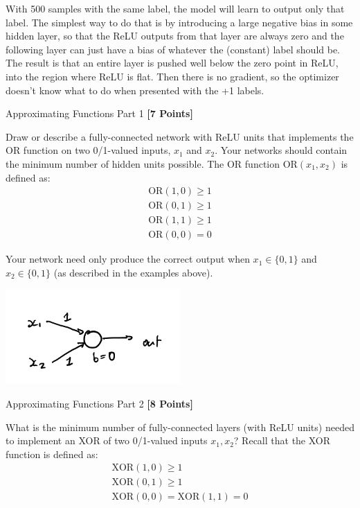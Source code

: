 \textit{}

\begin{solution}
  With 500 samples with the same label, the model will learn to output only that label.
  The simplest way to do that is by introducing a large negative bias in some hidden layer, so that the ReLU outputs from that layer are always zero and the following layer can just have a bias of whatever the (constant) label should be.
  The result is that an entire layer is pushed well below the zero point in ReLU, into the region where ReLU is flat.
  Then there is no gradient, so the optimizer doesn't know what to do when presented with the +1 labels.
\end{solution}



\problem Approximating Functions Part 1 \textbf{[7 Points]}

Draw or describe a fully-connected network with ReLU units that implements the OR function on two 0/1-valued inputs,  $x_1$ and $x_2$.  Your networks should contain the minimum number of hidden units possible.  The OR function $\text{OR}(x_1, x_2)$ is defined as:
\begin{gather*}
\text{OR}(1, 0) \geq 1 \\
\text{OR}(0, 1) \geq 1 \\
\text{OR}(1, 1) \geq 1 \\
\text{OR}(0, 0) = 0
\end{gather*}

Your network need only produce the correct output when $x_1 \in \{0, 1\}$ and $x_2 \in \{0, 1\}$ (as described in the examples above).

\begin{subsolution}

  \includegraphics[width=0.5\textwidth]{images/1d.png}
\end{subsolution}

\problem Approximating Functions Part 2 \textbf{[8 Points]}

What is the minimum number of fully-connected layers (with ReLU units) needed to implement an XOR of two 0/1-valued inputs $x_1, x_2$? Recall that the XOR function is defined as:
\begin{gather*}
\text{XOR}(1, 0) \geq 1 \\
\text{XOR}(0, 1) \geq 1 \\
\text{XOR}(0, 0) = \text{XOR}(1, 1) = 0
\end{gather*}

